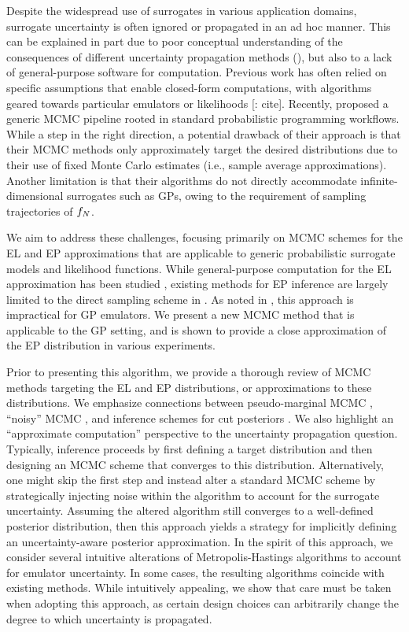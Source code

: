 \documentclass[12pt]{article}
\begin{document}
Despite the widespread use of surrogates in various application domains, 
surrogate uncertainty is often ignored or propagated in an ad hoc manner.
This can be explained in part due to poor conceptual understanding 
of the consequences of different uncertainty propagation methods
(), but also to a lack of general-purpose software
for computation. Previous work has often relied on specific assumptions that
enable closed-form computations, with algorithms geared towards
particular emulators or likelihoods [\todo: cite]. Recently, \citep{BurknerSurrogate}
proposed a generic MCMC pipeline rooted in standard probabilistic programming
workflows. While a step in the right direction, a potential drawback of their approach
is that their MCMC methods only approximately target the desired distributions 
due to their use of fixed Monte Carlo estimates (i.e., sample average approximations).
Another limitation is that their algorithms do not directly accommodate 
infinite-dimensional surrogates such as GPs, owing to the requirement of 
sampling trajectories of $f_{N}$.

We aim to address these challenges, focusing primarily on MCMC schemes for the EL
and EP approximations that are applicable to generic probabilistic surrogate models 
and likelihood functions. While general-purpose computation for the EL approximation 
has been studied \citep{garegnani2021NoisyMCMC}, existing methods for EP inference
are largely limited to the direct sampling scheme in . As noted in 
\citep{VehtariParallelGP,StuartTeck2}, this approach is impractical for GP emulators.
We present a new MCMC method that is applicable to the GP setting, and is
shown to provide a close approximation of the EP distribution in various experiments.

Prior to presenting this algorithm, we provide a thorough review of MCMC methods
targeting the EL and EP distributions, or approximations to these distributions. 
We emphasize connections between pseudo-marginal MCMC \citep{pseudoMarginalMCMC}, 
``noisy'' MCMC \citep{noisyMCMC}, and inference schemes for cut 
posteriors \citep{PlummerCut}. We also highlight an ``approximate computation'' 
perspective to the uncertainty propagation question. Typically, inference proceeds
by first defining a target distribution and then designing an MCMC scheme that
converges to this distribution. Alternatively, one might skip the first step and instead 
alter a standard MCMC scheme by strategically injecting noise within the 
algorithm to account for the surrogate uncertainty. Assuming the altered algorithm 
still converges to a well-defined posterior distribution, then this approach yields 
a strategy for implicitly defining an uncertainty-aware posterior approximation.
In the spirit of this approach, we consider several intuitive alterations of Metropolis-Hastings
algorithms to account for emulator uncertainty. In some cases, the resulting algorithms
coincide with existing methods. While intuitively appealing, we show that care must 
be taken when adopting this approach, as certain design choices can arbitrarily change the 
degree to which uncertainty is propagated.
\end{document}

